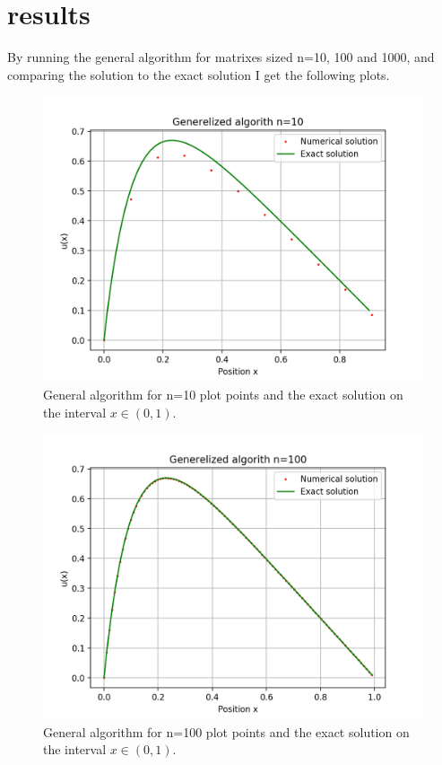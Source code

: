 \documentclass[12pt]{article}
\begin{document}
\section{results}

By running the general algorithm for matrixes sized n=10, 100 and 1000, and comparing the solution to the exact solution I get the following plots.

\begin{figure}[H]
  \center
  \includegraphics[scale=0.5]{alg-0-n10plot.png}
  \caption{General algorithm for n=10 plot points and the exact solution on the interval $x\in (0,1)$.}
  \label{fig:plotn10}
\end{figure}
\begin{figure}[H]
  \center
  \includegraphics[scale=0.5]{alg-0-n100plot.png}  \caption{General algorithm for n=100 plot points and the exact solution on the interval $x\in (0,1)$.}
  \label{fig:plotn100}
\end{figure}
\end{document}
